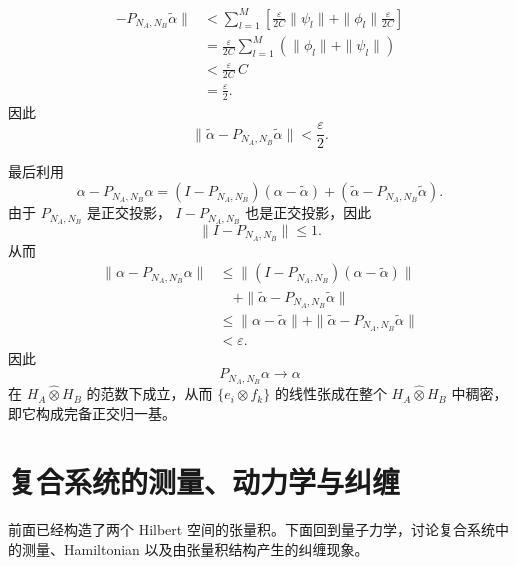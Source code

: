 \documentclass[UTF8,a4paper,11pt,openany]{ctexbook}
\begin{document}
\begin{proofblock}
\begin{align}
        -
        P_{N_A,N_B}\widetilde{\alpha}
    \|
    &<
    \sum_{l=1}^{M}
    \left[
        \frac{\varepsilon}{2C}\|\psi_l\|
        +
        \|\phi_l\|
        \frac{\varepsilon}{2C}
    \right]
    \nonumber\\
    &=
    \frac{\varepsilon}{2C}
    \sum_{l=1}^{M}
    \left(
        \|\phi_l\|+\|\psi_l\|
    \right)
    \nonumber\\
    &<
    \frac{\varepsilon}{2C}\,C
    \nonumber\\
    &=
    \frac{\varepsilon}{2}.
\end{align}
因此
\begin{equation}
    \|
        \widetilde{\alpha}
        -
        P_{N_A,N_B}\widetilde{\alpha}
    \|
    <
    \frac{\varepsilon}{2}.
\end{equation}

最后利用
\[
\alpha-P_{N_A,N_B}\alpha
=
(I-P_{N_A,N_B})(\alpha-\widetilde{\alpha})
+
\left(
    \widetilde{\alpha}
    -
    P_{N_A,N_B}\widetilde{\alpha}
\right).
\]
由于 $P_{N_A,N_B}$ 是正交投影，
$I-P_{N_A,N_B}$ 也是正交投影，因此
\[
\|I-P_{N_A,N_B}\|\leq1.
\]
从而
\begin{align}
    \|
        \alpha-P_{N_A,N_B}\alpha
    \|
    &\leq
    \|
        (I-P_{N_A,N_B})
        (\alpha-\widetilde{\alpha})
    \|
    \nonumber\\
    &\quad+
    \|
        \widetilde{\alpha}
        -
        P_{N_A,N_B}\widetilde{\alpha}
    \|
    \nonumber\\
    &\leq
    \|\alpha-\widetilde{\alpha}\|
    +
    \|
        \widetilde{\alpha}
        -
        P_{N_A,N_B}\widetilde{\alpha}
    \|
    \nonumber\\
    &<
    \varepsilon.
\end{align}
因此
\begin{equation}
    P_{N_A,N_B}\alpha
    \longrightarrow
    \alpha
\end{equation}
在 $H_A\widehat{\otimes}H_B$ 的范数下成立，从而
$\{e_i\otimes f_k\}$ 的线性张成在整个
$H_A\widehat{\otimes}H_B$ 中稠密，即它构成完备正交归一基。
\end{proofblock}

\section{复合系统的测量、动力学与纠缠}

前面已经构造了两个 Hilbert 空间的张量积。下面回到量子力学，讨论复合系统中的测量、Hamiltonian 以及由张量积结构产生的纠缠现象。
\end{document}

